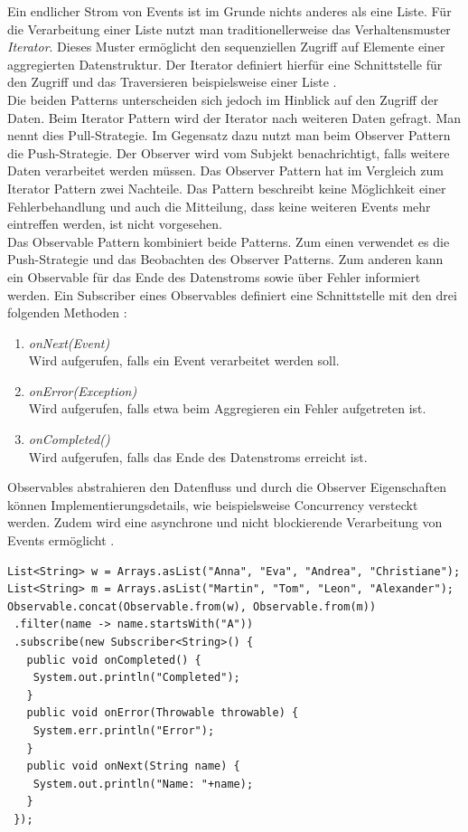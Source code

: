 Ein endlicher Strom von Events ist im Grunde nichts anderes als eine Liste. Für die Verarbeitung einer Liste nutzt man traditionellerweise das Verhaltensmuster \textit{Iterator}. Dieses Muster ermöglicht den sequenziellen Zugriff auf Elemente einer aggregierten Datenstruktur. Der Iterator definiert hierfür eine Schnittstelle für den Zugriff und das Traversieren beispielsweise einer Liste \cite[S.~257]{gamma_design_1995}.\\
Die beiden Patterns unterscheiden sich jedoch im Hinblick auf den Zugriff der Daten. Beim Iterator Pattern wird der Iterator nach weiteren Daten gefragt. Man nennt dies Pull-Strategie. Im Gegensatz dazu nutzt man beim Observer Pattern die Push-Strategie. Der Observer wird vom Subjekt benachrichtigt, falls weitere Daten verarbeitet werden müssen. Das Observer Pattern hat im Vergleich zum Iterator Pattern zwei Nachteile. Das Pattern beschreibt keine Möglichkeit einer Fehlerbehandlung und auch die Mitteilung, dass keine weiteren Events mehr eintreffen werden, ist nicht vorgesehen.\\
Das Observable Pattern kombiniert beide Patterns. Zum einen verwendet es die Push-Strategie und das Beobachten des Observer Patterns. Zum anderen kann ein Observable für das Ende des Datenstroms sowie über Fehler informiert werden. Ein Subscriber eines Observables definiert eine Schnittstelle mit den drei folgenden Methoden \cite{reactivex_2014}:

\begin{enumerate}
\item \textit{onNext(Event)}\\
Wird aufgerufen, falls ein Event verarbeitet werden soll.
\item \textit{onError(Exception)}\\
Wird aufgerufen, falls etwa beim Aggregieren ein Fehler aufgetreten ist.
\item \textit{onCompleted()}\\
Wird aufgerufen, falls das Ende des Datenstroms erreicht ist.
\end{enumerate}

Observables abstrahieren den Datenfluss und durch die Observer Eigenschaften können Implementierungsdetails, wie beispielsweise Concurrency versteckt werden. Zudem wird eine asynchrone und nicht blockierende Verarbeitung von Events ermöglicht \cite[S.~81]{kuhn_reactive_2015}.

\pagebreak

\begin{lstlisting}[caption={Zusammenknüpfen und filtern zweiter Listen mit RxJava},label={lst:rxjava}]
List<String> w = Arrays.asList("Anna", "Eva", "Andrea", "Christiane");
List<String> m = Arrays.asList("Martin", "Tom", "Leon", "Alexander");
Observable.concat(Observable.from(w), Observable.from(m))
 .filter(name -> name.startsWith("A"))
 .subscribe(new Subscriber<String>() {
   public void onCompleted() {
    System.out.println("Completed");
   }
   public void onError(Throwable throwable) {
    System.err.println("Error");
   }
   public void onNext(String name) {
    System.out.println("Name: "+name);
   }
 });
\end{lstlisting}

